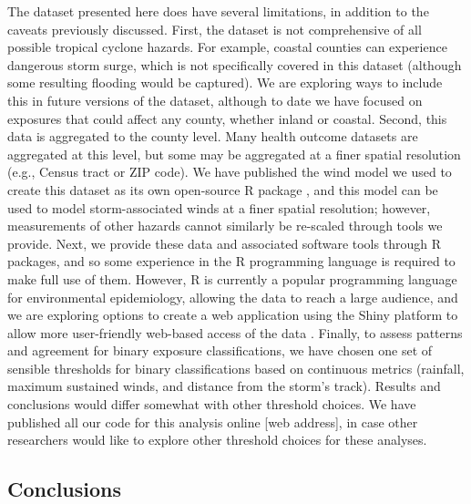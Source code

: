 The dataset presented here does have several limitations, in addition to the
caveats previously discussed. First, the dataset is not comprehensive of all
possible tropical cyclone hazards. For example, coastal counties can experience
dangerous storm surge, which is not specifically covered in this dataset
(although some resulting flooding would be captured). We are exploring ways to
include this in future versions of the dataset, although to date we have
focused on exposures that could affect any county, whether inland or coastal.
Second, this data is aggregated to the county level. Many health outcome
datasets are aggregated at this level, but some may be aggregated at a finer
spatial resolution (e.g., Census tract or ZIP code). We have published the wind
model we used to create this dataset as its own open-source R package
\parencite{stormwindmodel}, and this model can be used to model
storm-associated winds at a finer spatial resolution; however, measurements of
other hazards cannot similarly be re-scaled through tools we provide. Next,
we provide these data and associated software tools through R packages, and so
some experience in the R programming language is required to make full use of
them. However, R is currently a popular programming language for environmental
epidemiology, allowing the data to reach a large audience, and we are exploring
options to create a web application using the Shiny platform to allow more
user-friendly web-based access of the data \parencite{shiny2019}. 
Finally, to assess patterns and agreement for binary exposure classifications, 
we have chosen one set of sensible thresholds for binary classifications based
on continuous metrics (rainfall, maximum sustained winds, and distance from 
the storm's track). Results and conclusions would differ somewhat with other
threshold choices. We have published all our code for this analysis online
[web address], in case other researchers would like to explore other 
threshold choices for these analyses.

\subsection*{Conclusions}

